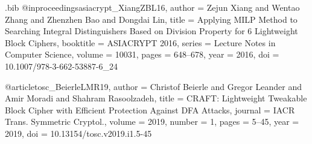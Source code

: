 \documentclass[table,aspectratio=169]{beamer}
\begin{document}
\begin{filecontents*}[overwrite]{\jobname.bib}
@inproceedings{asiacrypt_XiangZBL16,
  author    = {Zejun Xiang and
               Wentao Zhang and
               Zhenzhen Bao and
               Dongdai Lin},
  title     = {Applying {MILP} Method to Searching Integral Distinguishers Based
               on Division Property for 6 Lightweight Block Ciphers},
  booktitle = {{ASIACRYPT} 2016},
  series    = {Lecture Notes in Computer Science},
  volume    = {10031},
  pages     = {648--678},
  year      = {2016},
  doi       = {10.1007/978-3-662-53887-6_24}
}

@article{tosc_BeierleLMR19,
  author    = {Christof Beierle and
               Gregor Leander and
               Amir Moradi and
               Shahram Rasoolzadeh},
  title     = {{CRAFT:} Lightweight Tweakable Block Cipher with Efficient Protection
               Against {DFA} Attacks},
  journal   = {{IACR} Trans. Symmetric Cryptol.},
  volume    = {2019},
  number    = {1},
  pages     = {5--45},
  year      = {2019},
  doi       = {10.13154/tosc.v2019.i1.5-45}
}

\end{filecontents*}
\end{document}
